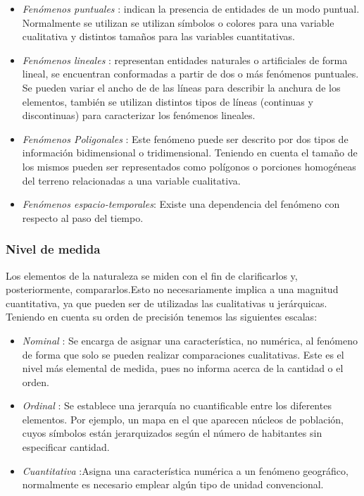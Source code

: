 \begin{itemize}
    \item \textit{Fenómenos puntuales} : indican la presencia de entidades de un modo puntual. Normalmente se utilizan se utilizan símbolos o colores para una variable cualitativa y distintos tamaños para las variables cuantitativas.

    \item \textit{Fenómenos lineales} : representan entidades naturales o artificiales de forma lineal, se encuentran conformadas a partir de dos o más fenómenos puntuales. Se pueden variar el ancho de de las líneas para describir la anchura de los elementos, también se utilizan distintos tipos de líneas (continuas y discontinuas) para caracterizar los fenómenos lineales.

    \item \textit{Fenómenos Poligonales} : Este fenómeno puede ser descrito por dos tipos de información bidimensional o tridimensional. Teniendo en cuenta el tamaño de los mismos pueden ser representados como polígonos o porciones homogéneas del terreno relacionadas a una variable cualitativa.

    \item \textit{Fenómenos espacio-temporales}: Existe una dependencia del fenómeno con respecto al paso del tiempo.
\end{itemize}

\subsubsection{Nivel de medida}

Los elementos de la naturaleza se miden con el fin de clarificarlos y, posteriormente, compararlos.Esto no necesariamente implica a una magnitud cuantitativa, ya que pueden ser de utilizadas las cualitativas u jerárquicas. Teniendo en cuenta su orden de precisión tenemos las siguientes escalas:

\begin{itemize}
    \item \textit{Nominal} : Se encarga de asignar una característica, no numérica, al fenómeno de forma que solo se pueden realizar comparaciones cualitativas. Este es el nivel más elemental de medida, pues no informa acerca de la cantidad o el orden.

    \item \textit{Ordinal} : Se establece una jerarquía no cuantificable entre los diferentes elementos. Por ejemplo, un mapa en el que aparecen núcleos de población, cuyos símbolos están jerarquizados según el número de habitantes sin especificar cantidad.

    \item \textit{Cuantitativa} :Asigna una característica numérica a un fenómeno geográfico, normalmente es necesario emplear algún tipo de unidad convencional.
\end{itemize}

